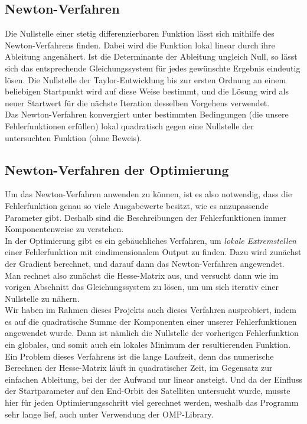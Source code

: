 \subsection{Newton-Verfahren}

Die Nullstelle einer stetig differenzierbaren Funktion lässt sich mithilfe des Newton-Verfahrens finden. Dabei wird die Funktion lokal linear durch ihre Ableitung angenähert. Ist die Determinante der Ableitung ungleich Null, so lässt sich das entsprechende Gleichungssystem für jedes gewünschte Ergebnis eindeutig lösen. Die Nullstelle der Taylor-Entwicklung bis zur ersten Ordnung an einem beliebigen Startpunkt wird auf diese Weise bestimmt, und die Lösung wird als neuer Startwert für die nächste Iteration desselben Vorgehens verwendet. \\
Das Newton-Verfahren konvergiert unter bestimmten Bedingungen (die unsere Fehlerfunktionen erfüllen) lokal quadratisch gegen eine Nullstelle der untersuchten Funktion (ohne Beweis).

\subsection{Newton-Verfahren der Optimierung}

Um das Newton-Verfahren anwenden zu können, ist es also notwendig, dass die Fehlerfunktion genau so viele Ausgabewerte besitzt, wie es anzupassende Parameter gibt. Deshalb sind die Beschreibungen der Fehlerfunktionen immer Komponentenweise zu verstehen.\\
In der Optimierung gibt es ein gebäuchliches Verfahren, um \textit{lokale Extremstellen} einer Fehlerfunktion mit eindimensionalem Output zu finden. Dazu wird zunächst der Gradient berechnet, und darauf dann das Newton-Verfahren angewendet. Man rechnet also zunächst die Hesse-Matrix aus, und versucht dann wie im vorigen Abschnitt das Gleichungssystem zu lösen, um um sich iterativ einer Nullstelle zu nähern. \\
Wir haben im Rahmen dieses Projekts auch dieses Verfahren ausprobiert, indem es auf die quadratische Summe der Komponenten einer unserer Fehlerfunktionen angewendet wurde. Dann ist nämlich die Nullstelle der vorherigen Fehlerfunktion ein globales, und somit auch ein lokales Minimum der resultierenden Funktion. \\
Ein Problem dieses Verfahrens ist die lange Laufzeit, denn das numerische Berechnen der Hesse-Matrix läuft in quadratischer Zeit, im Gegensatz zur einfachen Ableitung, bei der der Aufwand nur linear ansteigt. Und da der Einfluss der Startparameter auf den End-Orbit des Satelliten untersucht wurde, musste hier für jeden Optimierungsschritt viel gerechnet werden, weshalb das Programm sehr lange lief, auch unter Verwendung der OMP-Library.


